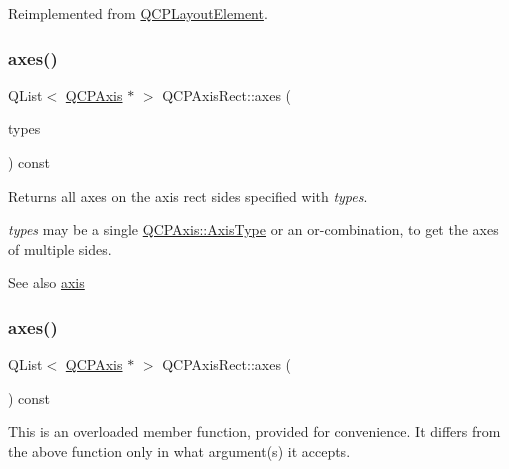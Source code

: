 Reimplemented from \mbox{\hyperlink{class_q_c_p_layout_element_a0a8f18141bcf46cf40ad4c13324ff346}{Q\+C\+P\+Layout\+Element}}.

\mbox{\label{class_q_c_p_axis_rect_a8db4722cb93e9c4a6f0d91150c200867}} 
\subsubsection{\texorpdfstring{axes()}{axes()}\hspace{0.1cm}{\footnotesize\ttfamily [1/2]}}
{\footnotesize\ttfamily Q\+List$<$ \mbox{\hyperlink{class_q_c_p_axis}{Q\+C\+P\+Axis}} $\ast$ $>$ Q\+C\+P\+Axis\+Rect\+::axes (\begin{DoxyParamCaption}\item[{Q\+C\+P\+Axis\+::\+Axis\+Types}]{types }\end{DoxyParamCaption}) const}

Returns all axes on the axis rect sides specified with {\itshape types}.

{\itshape types} may be a single \mbox{\hyperlink{class_q_c_p_axis_ae2bcc1728b382f10f064612b368bc18a}{Q\+C\+P\+Axis\+::\+Axis\+Type}} or an {\ttfamily or}-\/combination, to get the axes of multiple sides.

\begin{DoxySeeAlso}{See also}
\mbox{\hyperlink{class_q_c_p_axis_rect_a583ae4f6d78b601b732183f6cabecbe1}{axis}} 
\end{DoxySeeAlso}
\mbox{\label{class_q_c_p_axis_rect_a11657b8faebe9677180860e8057ede26}} 
\subsubsection{\texorpdfstring{axes()}{axes()}\hspace{0.1cm}{\footnotesize\ttfamily [2/2]}}
{\footnotesize\ttfamily Q\+List$<$ \mbox{\hyperlink{class_q_c_p_axis}{Q\+C\+P\+Axis}} $\ast$ $>$ Q\+C\+P\+Axis\+Rect\+::axes (\begin{DoxyParamCaption}{ }\end{DoxyParamCaption}) const}

This is an overloaded member function, provided for convenience. It differs from the above function only in what argument(s) it accepts.


